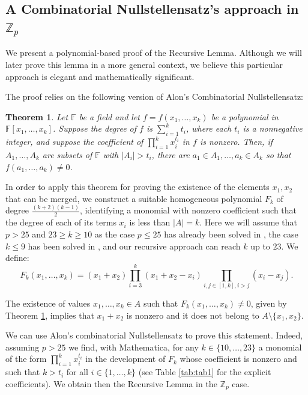 \documentclass[11pt]{amsart}
\newtheorem{theorem}{Theorem}[section]
\theoremstyle{definition}
\begin{document}
\subsection{A Combinatorial Nullstellensatz's approach in $\mathbb{Z}_p$}

We present a polynomial-based proof of the Recursive Lemma. Although we will later prove this lemma in a more general context, we believe this particular approach is elegant and mathematically significant.

The proof relies on the following version of Alon’s Combinatorial Nullstellensatz:
\begin{theorem}\cite[Theorem 1.2]{Alon}\label{thm:alon}
Let $\mathbb{F}$ be a field and let $f=f(x_1,\ldots,x_k)$ be a polynomial in $\mathbb{F}[x_1,\ldots,x_k]$. Suppose the degree of $f$ is 
$\sum\limits_{i=1}^k t_i$, 
where each $t_i$ is a nonnegative integer, and suppose the coefficient of
$\prod\limits_{i=1}^k x_i^{t_i}$ in $f$ is nonzero.
Then, if $A_1,\ldots,A_k$ are subsets of $\mathbb{F}$ with $|A_i|> t_i$, there are $a_1 \in A_1,\ldots,a_k \in A_k$ so that 
$f(a_1,\ldots,a_k)\neq 0$.
\end{theorem}

In order to apply this theorem for proving the existence of the elements $x_1,x_2$ that can be merged, we construct a suitable homogeneous polynomial $F_k$ of degree $\frac{(k+2)(k-1)}{2}$, identifying a monomial with 
nonzero coefficient such that the degree of each of its terms $x_i$ is less than $|A|=k$. Here we will assume that $p>25$ and $23\geq k\geq 10$ as the case $p\leq 25$ has already been solved in \cite{CMPP18}, the case $k\leq 9$ has been solved in \cite{AL20}, and our recursive approach can reach $k$ up to $23$. 
We define: 
$$F_k(x_1,\dots,x_k)=(x_1+x_2)\prod_{i=3}^k(x_1+x_2-x_i)\prod_{i,j\in [1,k], i>j} (x_i-x_j).$$

The existence of values $x_1,\ldots,x_k\in A$ such that
$F_k(x_1,\ldots,x_k)\neq 0$, given by Theorem \ref{thm:alon}, implies that
$x_1+x_2$ is nonzero and it does not belong to $A\setminus \{x_1,x_2\}$.


We can use Alon's combinatorial Nullstellensatz  to prove this statement. Indeed, assuming $p>25$ we find, with Mathematica, for any $k\in \{10,\dots,23\}$ a monomial of the form $\prod_{i=1}^k x_i^{t_i}$ in the development of $F_k$ whose coefficient is nonzero and such that $k>t_i$ for all $i\in \{1,\dots,k\}$ (see Table \ref{tab:tab1} for the explicit coefficients). We obtain then the Recursive Lemma in the $\mathbb{Z}_p$ case.
\end{document}
